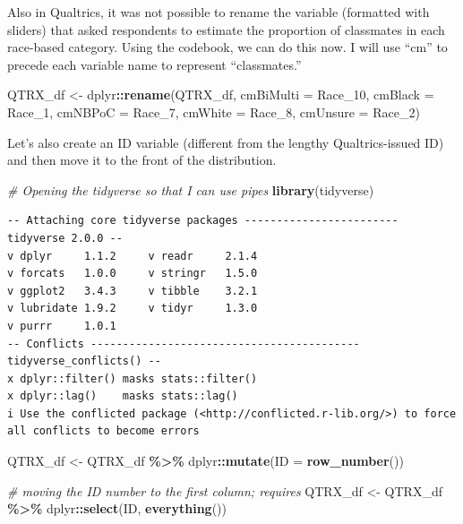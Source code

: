 \documentclass[
  11pt,
]{book}
\newenvironment{Shaded}{\begin{snugshade}}{\end{snugshade}}
\newcommand{\AttributeTok}[1]{\textcolor[rgb]{0.27,0.27,0.27}{#1}}
\newcommand{\CommentTok}[1]{\textcolor[rgb]{0.37,0.37,0.37}{\textit{#1}}}
\newcommand{\FunctionTok}[1]{\textcolor[rgb]{0.27,0.27,0.27}{\textbf{#1}}}
\newcommand{\NormalTok}[1]{#1}
\newcommand{\OtherTok}[1]{\textcolor[rgb]{0.37,0.37,0.37}{#1}}
\newcommand{\SpecialCharTok}[1]{\textcolor[rgb]{0.43,0.43,0.43}{\textbf{#1}}}
\begin{document}
Also in Qualtrics, it was not possible to rename the variable (formatted with sliders) that asked respondents to estimate the proportion of classmates in each race-based category. Using the codebook, we can do this now. I will use ``cm'' to precede each variable name to represent ``classmates.''

\begin{Shaded}
\begin{Highlighting}[]
\NormalTok{QTRX\_df }\OtherTok{\textless{}{-}}\NormalTok{ dplyr}\SpecialCharTok{::}\FunctionTok{rename}\NormalTok{(QTRX\_df, }\AttributeTok{cmBiMulti =}\NormalTok{ Race\_10, }\AttributeTok{cmBlack =}\NormalTok{ Race\_1,}
    \AttributeTok{cmNBPoC =}\NormalTok{ Race\_7, }\AttributeTok{cmWhite =}\NormalTok{ Race\_8, }\AttributeTok{cmUnsure =}\NormalTok{ Race\_2)}
\end{Highlighting}
\end{Shaded}

Let's also create an ID variable (different from the lengthy Qualtrics-issued ID) and then move it to the front of the distribution.

\begin{Shaded}
\begin{Highlighting}[]
\CommentTok{\# Opening the tidyverse so that I can use pipes}
\FunctionTok{library}\NormalTok{(tidyverse)}
\end{Highlighting}
\end{Shaded}

\begin{verbatim}
-- Attaching core tidyverse packages ------------------------ tidyverse 2.0.0 --
v dplyr     1.1.2     v readr     2.1.4
v forcats   1.0.0     v stringr   1.5.0
v ggplot2   3.4.3     v tibble    3.2.1
v lubridate 1.9.2     v tidyr     1.3.0
v purrr     1.0.1     
-- Conflicts ------------------------------------------ tidyverse_conflicts() --
x dplyr::filter() masks stats::filter()
x dplyr::lag()    masks stats::lag()
i Use the conflicted package (<http://conflicted.r-lib.org/>) to force all conflicts to become errors
\end{verbatim}

\begin{Shaded}
\begin{Highlighting}[]
\NormalTok{QTRX\_df }\OtherTok{\textless{}{-}}\NormalTok{ QTRX\_df }\SpecialCharTok{\%\textgreater{}\%}
\NormalTok{    dplyr}\SpecialCharTok{::}\FunctionTok{mutate}\NormalTok{(}\AttributeTok{ID =} \FunctionTok{row\_number}\NormalTok{())}

\CommentTok{\# moving the ID number to the first column; requires}
\NormalTok{QTRX\_df }\OtherTok{\textless{}{-}}\NormalTok{ QTRX\_df }\SpecialCharTok{\%\textgreater{}\%}
\NormalTok{    dplyr}\SpecialCharTok{::}\FunctionTok{select}\NormalTok{(ID, }\FunctionTok{everything}\NormalTok{())}
\end{Highlighting}
\end{Shaded}
\end{document}
